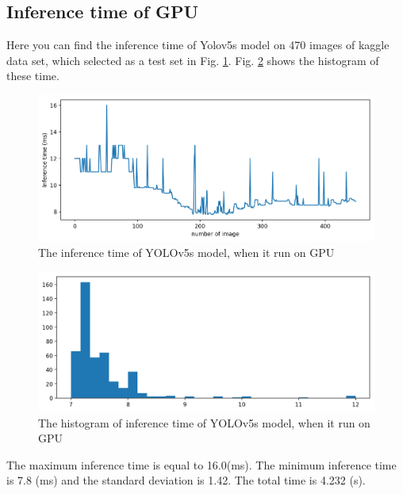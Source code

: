 \documentclass[12pt,a4paper]{article}
\begin{document}
\subsection*{Inference time of GPU}
 Here you can find the inference time of Yolov5s model on 470 images of kaggle data set, which selected as a test set in Fig. \ref{fig: gpus}. Fig. \ref{fig: gpus_hist} shows the histogram of these time.
\begin{figure}[H]
    \centering
    \includegraphics[width=15cm]{figures/Inftime_yolov5s_gpu.png}
    \caption{The inference time of YOLOv5s model, when it run on GPU}
    \label{fig: gpus}
\end{figure}
\begin{figure}[H]
    \centering
    \includegraphics[width=15cm]{figures/Inftime_yolov5s_gpu_hist.png}
    \caption{The histogram of inference time of YOLOv5s model, when it run on GPU}
    \label{fig: gpus_hist}
\end{figure}
The maximum inference time is equal to 16.0(ms). The minimum inference time is 7.8 (ms) and the standard deviation is 1.42. The total time is 4.232 (s).
\end{document}
